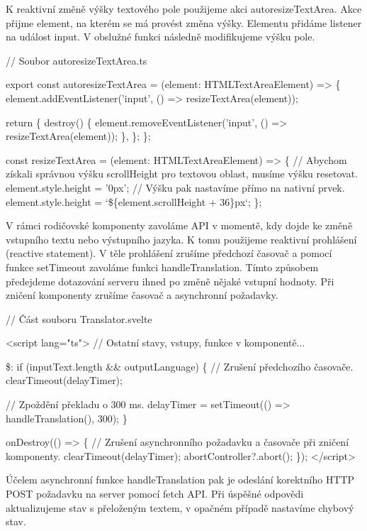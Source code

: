 K reaktivní změně výšky textového pole použijeme akci autoresizeTextArea. Akce přijme element, na kterém se má provést změna výšky. Elementu přidáme listener na událost input. 
V obslužné funkci následně modifikujeme výšku pole.

\begin{prog}
// Soubor autoresizeTextArea.ts

export const autoresizeTextArea = (element: HTMLTextAreaElement) => \{
  element.addEventListener('input', () => resizeTextArea(element));

  return \{
    destroy() \{
      element.removeEventListener('input', () => resizeTextArea(element));
    \},
  \};
\};

const resizeTextArea = (element: HTMLTextAreaElement) => \{
  // Abychom získali správnou výšku scrollHeight 
    pro textovou oblast, musíme výšku resetovat.
  element.style.height = '0px';
  // Výšku pak nastavíme přímo na nativní prvek.
  element.style.height = `\$\{element.scrollHeight + 36\}px`;
\};
\end{prog}

V rámci rodičovské komponenty zavoláme API v momentě, kdy dojde ke změně vstupního textu nebo výstupního jazyka. K tomu použijeme reaktivní prohlášení (reactive statement). 
V těle prohlášení zrušíme předchozí časovač a pomocí funkce setTimeout zavoláme funkci handleTranslation. Tímto způsobem předejdeme dotazování serveru ihned po změně nějaké vstupní hodnoty. 
Při zničení komponenty zrušíme časovač a asynchronní požadavky.

\begin{prog}
// Část souboru Translator.svelte

<script lang="ts">
  // Ostatní stavy, vstupy, funkce v komponentě...
  
  \$: if (inputText.length && outputLanguage) \{
    // Zrušení předchozího časovače.
    clearTimeout(delayTimer);

    // Zpoždění překladu o 300 ms.
    delayTimer = setTimeout(() => handleTranslation(), 300);
  \}

  onDestroy(() => \{
    // Zrušení asynchronního požadavku a časovače při zničení komponenty.
    clearTimeout(delayTimer);
    abortController?.abort();
  \});
</script>
\end{prog}

Účelem asynchronní funkce handleTranslation pak je odeslání korektního HTTP POST požadavku na server pomocí fetch API. 
Při úspěšné odpovědi aktualizujeme stav s přeloženým textem, v opačném případě nastavíme chybový stav.

